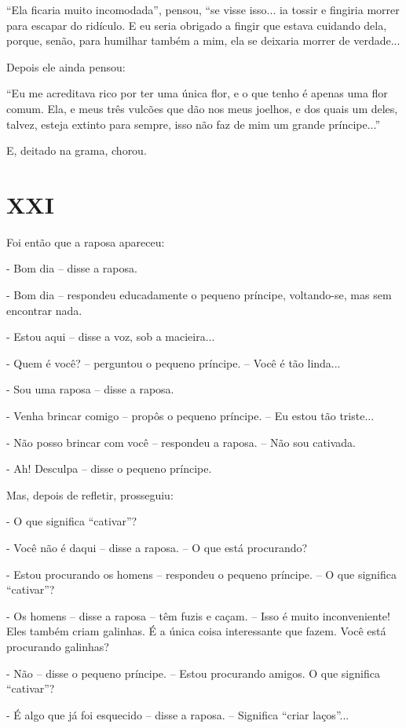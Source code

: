 ``Ela ficaria muito incomodada'', pensou, ``se visse isso... ia tossir e
fingiria morrer para escapar do ridículo. E eu seria obrigado a fingir
que estava cuidando dela, porque, senão, para humilhar também a mim, ela
se deixaria morrer de verdade...

Depois ele ainda pensou:

``Eu me acreditava rico por ter uma única flor, e o que tenho é apenas
uma flor comum. Ela, e meus três vulcões que dão nos meus joelhos, e dos
quais um deles, talvez, esteja extinto para sempre, isso não faz de mim
um grande príncipe...''

E, deitado na grama, chorou.

\chapter{XXI}

Foi então que a raposa apareceu:

- Bom dia -- disse a raposa.

- Bom dia -- respondeu educadamente o pequeno príncipe, voltando-se, mas
sem encontrar nada.

- Estou aqui -- disse a voz, sob a macieira...

- Quem é você? -- perguntou o pequeno príncipe. -- Você é tão linda...

- Sou uma raposa -- disse a raposa.

- Venha brincar comigo -- propôs o pequeno príncipe. -- Eu estou tão
triste...

- Não posso brincar com você -- respondeu a raposa. -- Não sou cativada.

- Ah! Desculpa -- disse o pequeno príncipe.

Mas, depois de refletir, prosseguiu:

- O que significa ``cativar''?

- Você não é daqui -- disse a raposa. -- O que está procurando?

- Estou procurando os homens -- respondeu o pequeno príncipe. -- O que
significa ``cativar''?

- Os homens -- disse a raposa -- têm fuzis e caçam. -- Isso é muito
inconveniente! Eles também criam galinhas. É a única coisa interessante
que fazem. Você está procurando galinhas?

- Não -- disse o pequeno príncipe. -- Estou procurando amigos. O que
significa ``cativar''?

- É algo que já foi esquecido -- disse a raposa. -- Significa ``criar
laços''...

